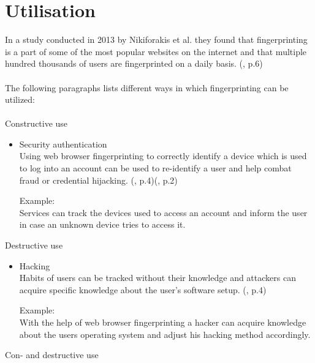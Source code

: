 \section{Utilisation}
\label{sec:utilisation}
In a study conducted in 2013 by Nikiforakis et al. they found that fingerprinting is a part of some of the most popular websites on the internet and that multiple hundred thousands of users are fingerprinted on a daily basis. (\textcite{nikiforakis13}, p.6) \\\\
The following paragraphs lists different ways in which fingerprinting can be utilized:\\\\
Constructive use
\begin{itemize}
	\item Security authentication\\
	Using web browser fingerprinting to correctly identify a device which is used to log into an account can be used to re-identify a user and help combat fraud or credential hijacking. (\textcite{upi15}, p.4)(\textcite{nikiforakis13}, p.2)
	\begin{tcolorbox}
	Example:\\
	Services can track the devices used to access an account and inform the user in case an unknown device tries to access it. 
	\end{tcolorbox}
\end{itemize}
Destructive use
\begin{itemize}
	\item Hacking\\
	Habits of users can be tracked without their knowledge and attackers can acquire specific knowledge about the user’s software setup. (\textcite{upi15}, p.4) 
	\begin{tcolorbox}
	Example:\\
	With the help of web browser fingerprinting a hacker can acquire knowledge about the users operating system and adjust his hacking method accordingly.
	\end{tcolorbox}
\end{itemize}
Con- and destructive use
